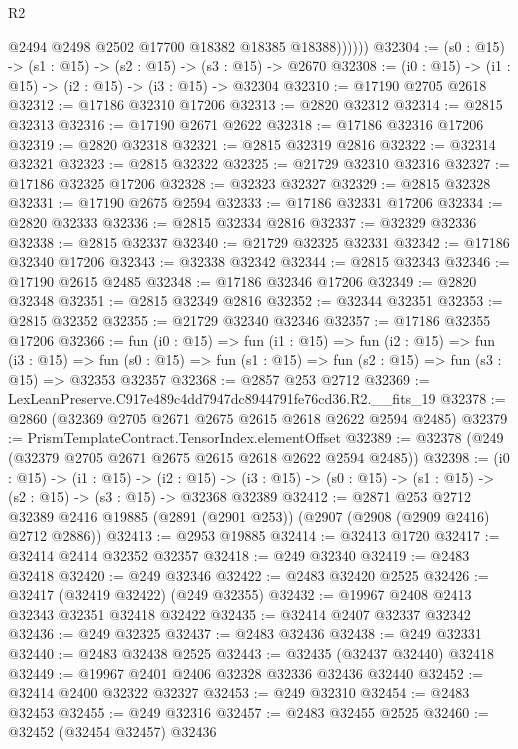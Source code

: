 \begin{lexlean}{R2}
\begin{coremodule}
                @2494
                @2498
                @2502
                @17700
                @18382
                @18385
                @18388))))))
@32304 := (s0 : @15) -> (s1 : @15) -> (s2 : @15) -> (s3 : @15) -> @2670
@32308 := (i0 : @15) -> (i1 : @15) -> (i2 : @15) -> (i3 : @15) -> @32304
@32310 := @17190 @2705 @2618
@32312 := @17186 @32310 @17206
@32313 := @2820 @32312
@32314 := @2815 @32313
@32316 := @17190 @2671 @2622
@32318 := @17186 @32316 @17206
@32319 := @2820 @32318
@32321 := @2815 @32319 @2816
@32322 := @32314 @32321
@32323 := @2815 @32322
@32325 := @21729 @32310 @32316
@32327 := @17186 @32325 @17206
@32328 := @32323 @32327
@32329 := @2815 @32328
@32331 := @17190 @2675 @2594
@32333 := @17186 @32331 @17206
@32334 := @2820 @32333
@32336 := @2815 @32334 @2816
@32337 := @32329 @32336
@32338 := @2815 @32337
@32340 := @21729 @32325 @32331
@32342 := @17186 @32340 @17206
@32343 := @32338 @32342
@32344 := @2815 @32343
@32346 := @17190 @2615 @2485
@32348 := @17186 @32346 @17206
@32349 := @2820 @32348
@32351 := @2815 @32349 @2816
@32352 := @32344 @32351
@32353 := @2815 @32352
@32355 := @21729 @32340 @32346
@32357 := @17186 @32355 @17206
@32366 := fun (i0 : @15) =>
  fun (i1 : @15) =>
  fun (i2 : @15) =>
  fun (i3 : @15) =>
  fun (s0 : @15) => fun (s1 : @15) => fun (s2 : @15) => fun (s3 : @15) => @32353 @32357
@32368 := @2857 @253 @2712
@32369 := LexLeanPreserve.C917e489c4dd7947dc8944791fe76cd36.R2.__fits_19
@32378 := @2860 (@32369 @2705 @2671 @2675 @2615 @2618 @2622 @2594 @2485)
@32379 := PrismTemplateContract.TensorIndex.elementOffset
@32389 := @32378 (@249 (@32379 @2705 @2671 @2675 @2615 @2618 @2622 @2594 @2485))
@32398 := (i0 : @15) ->
  (i1 : @15) ->
  (i2 : @15) -> (i3 : @15) -> (s0 : @15) -> (s1 : @15) -> (s2 : @15) -> (s3 : @15) -> @32368 @32389
@32412 := @2871
    @253
    @2712
    @32389
    @2416
    @19885
    (@2891 (@2901 @253))
    (@2907 (@2908 (@2909 @2416) @2712 @2886))
@32413 := @2953 @19885
@32414 := @32413 @1720
@32417 := @32414 @2414 @32352 @32357
@32418 := @249 @32340
@32419 := @2483 @32418
@32420 := @249 @32346
@32422 := @2483 @32420 @2525
@32426 := @32417 (@32419 @32422) (@249 @32355)
@32432 := @19967 @2408 @2413 @32343 @32351 @32418 @32422
@32435 := @32414 @2407 @32337 @32342
@32436 := @249 @32325
@32437 := @2483 @32436
@32438 := @249 @32331
@32440 := @2483 @32438 @2525
@32443 := @32435 (@32437 @32440) @32418
@32449 := @19967 @2401 @2406 @32328 @32336 @32436 @32440
@32452 := @32414 @2400 @32322 @32327
@32453 := @249 @32310
@32454 := @2483 @32453
@32455 := @249 @32316
@32457 := @2483 @32455 @2525
@32460 := @32452 (@32454 @32457) @32436

\end{coremodule}
\end{lexlean}
